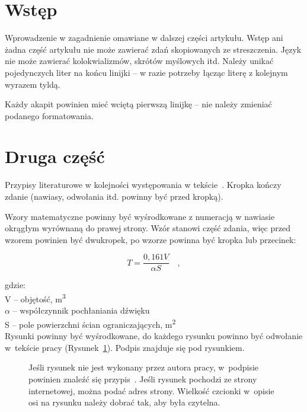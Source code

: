 \documentclass[12pt]{oska}
\affiliation{Akademia Górniczo-Hutnicza im. S. Staszica w Krakowie}
\begin{document}
\maketitles

\section{Wstęp}

Wprowadzenie w zagadnienie omawiane w dalszej części artykułu. Wstęp ani żadna część artykułu nie może zawierać zdań skopiowanych ze streszczenia. Język nie może zawierać kolokwializmów, skrótów myślowych itd. Należy unikać pojedynczych liter na końcu linijki -- w razie potrzeby łącząc literę z kolejnym wyrazem tyldą.

Każdy akapit powinien mieć wciętą pierwszą linijkę -- nie należy zmieniać podanego formatowania.

\section{Druga część}

Przypisy literaturowe w kolejności występowania w tekście~\cite{bib1}. Kropka kończy zdanie (nawiasy, odwołania itd. powinny być przed kropką).

Wzory matematyczne powinny być wyśrodkowane z numeracją w nawiasie okrągłym wyrównaną do prawej strony. Wzór stanowi część zdania, więc przed wzorem powinien być dwukropek, po wzorze powinna być kropka lub przecinek:

\begin{equation}
	T = \frac{0,161 V}{\alpha S} \quad, \label{wzor1}
\end{equation}


\noindent gdzie:\\
V -- objętość, \si{\meter\cubed}\\
$\alpha$ -- współczynnik pochłaniania dźwięku\\
S -- pole powierzchni ścian ograniczających, \si{\meter\squared}\\

Rysunki powinny być wyśrodkowane, do każdego rysunku powinno być odwołanie w~tekście pracy (Rysunek~\ref{rys1}). Podpis znajduje się pod rysunkiem.

\begin{figure}[H]
	\centering
	\caption{Jeśli rysunek nie jest wykonany przez autora pracy, w~podpisie powinien znaleźć się przypis~\cite{bib2}. Jeśli rysunek pochodzi ze strony internetowej, można podać adres strony. Wielkość czcionki w~opisie osi na rysunku należy dobrać tak, aby była czytelna.}
	\label{rys1}
\end{figure}
\end{document}
